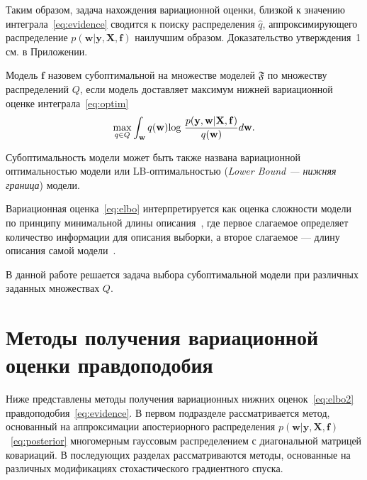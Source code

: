 \documentclass[12pt]{a&t}
\begin{document}
Таким образом, задача нахождения вариационной оценки, близкой к значению интеграла~\eqref{eq:evidence} сводится к поиску распределения $\hat{q}$, аппроксимирующего распределение $p(\mathbf{w}|\mathbf{y}, \mathbf{X}, \mathbf{f})$ наилучшим образом. Доказательство утверждения~1 см. в Приложении.

\begin{definition} Модель $\mathbf{f}$ назовем субоптимальной на множестве моделей $\mathfrak{F}$  по множеству распределений ${Q}$, если модель доставляет максимум нижней вариационной оценке интеграла~\eqref{eq:optim}
\begin{equation}
\label{eq:elbo2}
	\max_{q \in {Q}}\int_{\mathbf{w}} q(\mathbf{w})\textnormal{log}~\frac{p(\mathbf{y},\mathbf{w}|\mathbf{X},\mathbf{f})}{q(\mathbf{w})}d\mathbf{w}.
\end{equation}
\end{definition}

{
Субоптимальность модели может быть также названа вариационной оптимальностью модели или LB-оптимальностью (\textit{Lower Bound --- нижняя граница}) модели.}

Вариационная оценка~\eqref{eq:elbo} интерпретируется как оценка сложности модели по принципу минимальной длины описания~\cite{mdl}, где первое слагаемое определяет количество информации для описания выборки, а второе слагаемое --- длину описания самой модели~\cite{nips}.


В данной работе решается задача выбора субоптимальной модели при различных заданных множествах $Q$.

\section{Методы получения вариационной оценки правдоподобия}
Ниже представлены методы получения вариационных нижних оценок~\eqref{eq:elbo2} правдоподобия~\eqref{eq:evidence}. В первом подразделе рассматривается метод, основанный на аппроксимации апостериорного распределения $p( \mathbf{w}|\mathbf{y}, \mathbf{X}, \mathbf{f})$~\eqref{eq:posterior} многомерным гауссовым распределением с диагональной матрицей ковариаций. В последующих разделах рассматриваются методы, основанные на различных модификациях стохастического градиентного спуска. 
\end{document}
